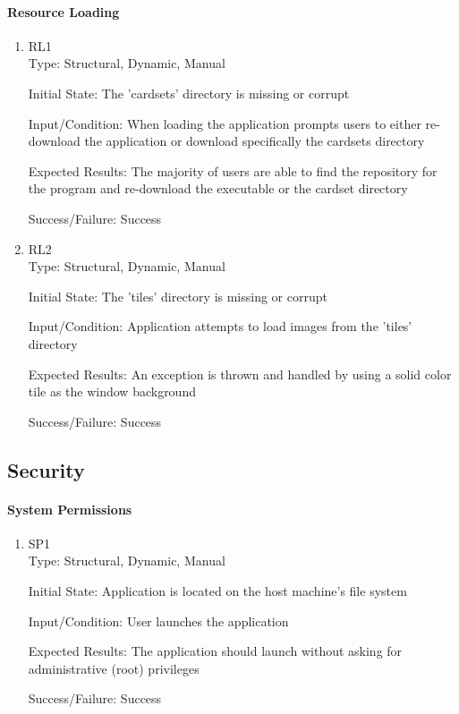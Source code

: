 \documentclass[12pt, titlepage]{article}
\begin{document}
	\paragraph{Resource Loading}
	\begin{enumerate}
		\item{RL1\\}
		Type: Structural, Dynamic, Manual
		
		Initial State: The 'cardsets' directory is missing or corrupt
		
		Input/Condition: When loading the application prompts users to either
		re-download the application or download specifically the cardsets directory
		
		Expected Results: The majority of users are able to find the repository for the
		program and re-download the executable or the cardset directory

		Success/Failure: Success
		
		\item{RL2\\}
		Type: Structural, Dynamic, Manual
		
		Initial State: The 'tiles' directory is missing or corrupt
		
		Input/Condition: Application attempts to load images from the 'tiles' directory
		
		Expected Results: An exception is thrown and handled by using a solid color tile
		as the window background

		Success/Failure: Success
	\end{enumerate}
	
	\subsection{Security}
	\paragraph{System Permissions}
	\begin{enumerate}
		\item{SP1\\}
		Type: Structural, Dynamic, Manual
		
		Initial State: Application is located on the host machine's file system
		
		Input/Condition: User launches the application
		
		Expected Results: The application should launch without asking for administrative
		(root) privileges

		Success/Failure: Success
	\end{enumerate}
\end{document}
